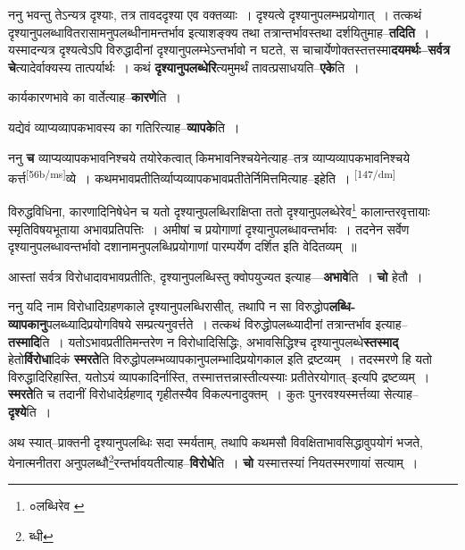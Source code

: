 \documentclass[article,12pt,a4paper]{memoir}
\begin{document}
	  \pstart ननु भवन्तु तेऽन्यत्र दृश्याः, तत्र तावददृश्या एव वक्तव्याः । दृश्यत्वे दृश्यानुपलम्भप्रयोगात् । तत्कथं दृश्यानुपलब्धावितरासामनुपलब्धीनामन्तर्भाव इत्याशङ्क्य तथा तत्रान्तर्भावस्तथा दर्शयितुमाह--\textbf{तदिति} । यस्मादन्यत्र दृश्यत्वेऽपि विरुद्धादीनां दृश्यानुपलम्भेऽन्तर्भावो न घटते, स चाचार्येणोक्तस्तत्तस्मा\textbf{दयमर्थः--सर्वत्र चे}त्यादेर्वाक्यस्य तात्पर्यार्थः । कथं \textbf{दृश्यानुपलब्धेरि}त्यमुमर्थं तावत्प्रसाधयति--\textbf{एके}ति ।
	\pend
      

	  \pstart कार्यकारणभावे का वार्तेत्याह--\textbf{कारणे}ति ।
	\pend
      

	  \pstart यद्येवं व्याप्यव्यापकभावस्य का गतिरित्याह--\textbf{व्यापके}ति ।
	\pend
      

	  \pstart ननु \textbf{च} व्याप्यव्यापकभावनिश्चये तयोरेकत्वात् किमभावनिश्चयेनेत्याह--तत्र व्याप्यव्यापकभावनिश्चये कर्त्त\leavevmode\textsuperscript{\rmlatinfont\tiny [56b/ms]}व्ये । कथमभावप्रतीतिर्व्याप्यव्यापकभावप्रतीतेर्निमित्तमित्याह--इहेति ।
	\pend
      \leavevmode\textsuperscript{\rmlatinfont\tiny [147/dm]}

	  \pstart विरुद्धविधिना, कारणादिनिषेधेन च यतो दृश्यानुपलब्धिराक्षिप्ता ततो दृश्यानुपलब्धेरेव\footnote{०लब्धिरेव \cite{dp-msC}} कालान्तरवृत्तायाः स्मृतिविषयभूताया अभावप्रतिपत्तिः । अमीषां च प्रयोगाणां दृश्यानुपलब्धावन्तर्भावः । तदनेन सर्वेण दृश्यानुपलब्धावन्तर्भावो दशानामनुपलब्धिप्रयोगाणां पारम्पर्येण दर्शित इति वेदितव्यम् ॥
	\pend
      

	  \pstart आस्तां सर्वत्र विरोधादावभावप्रतीतिः, दृश्यानुपलब्धिस्तु क्वोपयुज्यत इत्याह—\textbf{अभावे}ति । \textbf{चो} हेतौ ।
	\pend
      

	  \pstart ननु यदि नाम विरोधादिग्रहणकाले दृश्यानुपलब्धिरासीत्, तथापि न सा विरुद्धोप\textbf{लब्धि-व्यापकानु}पलब्ध्यादिप्रयोगविषये सम्प्रत्यनुवर्त्तते । तत्कथं विरुद्धोपलब्ध्यादीनां तत्रान्तर्भाव इत्याह--\textbf{तस्मादि}ति । यतोऽभावप्रतीतिमन्तरेण न विरोधादिसिद्धिः, अभावसिद्धिश्च दृश्यानुपलब्धे\textbf{स्तस्माद्} हेतो\textbf{र्विरोधा}दिकं \textbf{स्मरते}ति विरुद्धोपलम्भव्यापकानुपलम्भादिप्रयोगकाल इति द्रष्टव्यम् । तदस्मरणे हि यतो विरुद्धादिरिहास्ति, यतोऽयं व्यापकादिर्नास्ति, तस्मात्तत्तन्नास्तीत्यस्याः प्रतीतेरयोगात्--इत्यपि द्रष्टव्यम् । \textbf{स्मरते}ति च तदानीं विरोधादेर्ग्रहणाद् गृहीतस्यैव विकल्पनादुक्तम् । कुतः पुनरवश्यस्मर्त्तव्या सेत्याह--\textbf{दृश्ये}ति ।
	\pend
      

	  \pstart अथ स्यात्--प्राक्तनी दृश्यानुपलब्धिः सदा स्मर्यताम्, तथापि कथमसौ विवक्षिताभावसिद्धावुपयोगं भजते, येनात्मनीतरा अनुपलब्धौ\footnote{ब्धी}रन्तर्भावयतीत्याह--\textbf{विरोधे}ति । \textbf{चो} यस्मात्तस्यां नियतस्मरणायां सत्याम् ।
	\pend
      
\end{document}
